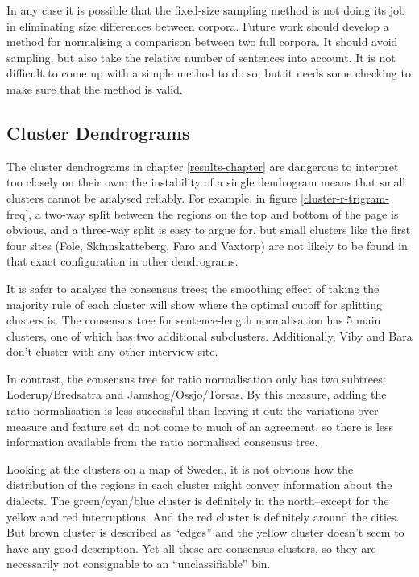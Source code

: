 In any case it is possible that the fixed-size sampling method is not doing its
job in eliminating size differences between corpora. Future work
should develop a method for normalising a comparison between two full
corpora. It should avoid sampling, but also take the relative number
of sentences into account. It is not difficult to come up
with a simple method to do so, but it needs some checking to make sure
that the method is valid.

\subsection{Cluster Dendrograms}

The cluster dendrograms in chapter \ref{results-chapter} are dangerous
to interpret too closely on their own; the instability of a single
dendrogram means that small clusters cannot be analysed reliably. For
example, in figure \ref{cluster-r-trigram-freq}, a two-way split
between the regions on the top and bottom of the page is
obvious, and a three-way split is easy to argue for, but small
clusters like the first four sites (Fole, Skinnskatteberg, Faro and
Vaxtorp) are not likely to be found in that exact configuration in
other dendrograms.

It is safer to analyse the consensus trees; the smoothing effect of
taking the majority rule of each cluster will show where the optimal
cutoff for splitting clusters is. The consensus tree for
sentence-length normalisation has 5 main clusters, one of which has
two additional subclusters. Additionally, Viby and Bara don't cluster
with any other interview site.


In contrast, the consensus tree for ratio normalisation only has two
subtrees: Loderup/Bredsatra and Jamshog/Ossjo/Torsas. By this measure,
adding the ratio normalisation is less successful than leaving it out:
the variations over measure and feature set do not come to much of an
agreement, so there is less information available from the ratio
normalised consensus tree.


Looking at the clusters on a map of Sweden, it is not obvious how the
distribution of the regions in each cluster might convey information
about the dialects. The green/cyan/blue cluster is definitely in the
north--except for the yellow and red interruptions. And the red
cluster is definitely around the cities. But brown cluster is
described as ``edges'' and the yellow cluster doesn't seem to have any
good description. Yet all these are consensus clusters, so they are
necessarily not consignable to an ``unclassifiable'' bin.

